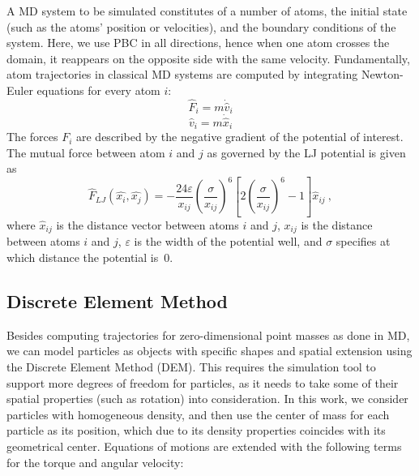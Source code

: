 \documentclass[preprint,12pt]{elsarticle}
\begin{document}
A \ac{MD} system to be simulated constitutes of a number of atoms, the initial state (such as the atoms' position or velocities), and the boundary conditions of the system.
Here, we use \ac{PBC} in all directions, hence when one atom crosses the domain, it reappears on the opposite side with the same velocity.
Fundamentally, atom trajectories in classical \ac{MD} systems are computed by integrating Newton-Euler equations for every atom $i$:
\begin{equation}
    \hat F_i = m \dot{\hat v}_i \label{eq:newton_force}
\end{equation}
\begin{equation}
    \hat v_i = m \dot{\hat x}_i \label{eq:newton_velocity}
\end{equation}
The forces $F_i$ are described by the negative gradient of the potential of interest.
The mutual force between atom $i$ and $j$ as governed by the \ac{LJ} potential
is given as
\begin{equation}
    \hat{F}_{LJ}(\hat{x_i}, \hat{x_j}) = -\frac{24\varepsilon}{x_{ij}} \left( \frac{\sigma}{x_{ij}} \right)^{6} \left[ 2\left(\frac{\sigma}{x_{ij}}\right)^{6} - 1\right] \hat{x}_{ij}~,
    \label{eq:lennard_jones}
\end{equation}
where $\hat{x}_{ij}$ is the distance vector between atoms $i$ and $j$, $x_{ij}$ is the distance between atoms $i$ and $j$, $\varepsilon$ is the width of the potential well, and $\sigma$ specifies at which distance the potential is~$0$.

\subsection{Discrete Element Method}
\label{sec:dem}

Besides computing trajectories for zero-dimensional point masses as done in MD, we can model particles as objects with specific shapes and spatial extension using the Discrete Element Method (DEM).
This requires the simulation tool to support more degrees of freedom for particles, as it needs to take some of their spatial properties (such as rotation) into consideration.
In this work, we consider particles with homogeneous density, and then use the center of mass for each particle as its position, which due to its density properties coincides with its geometrical center.
Equations of motions are extended with the following terms for the torque and angular velocity:
\end{document}
